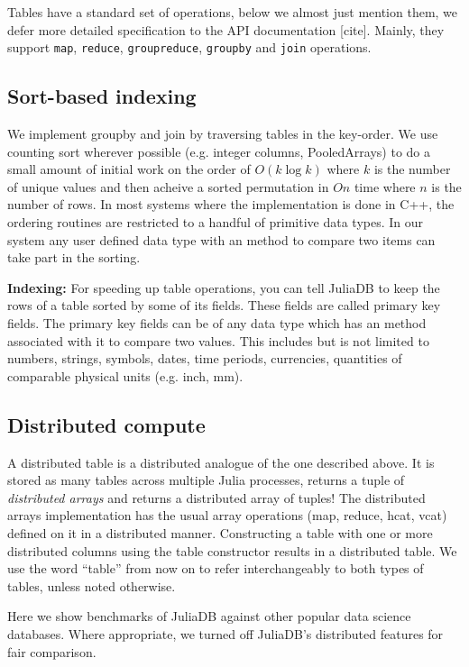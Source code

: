 \documentclass{juliacon}
\begin{document}
Tables have a standard set of operations, below we almost just mention
them, we defer more detailed specification to the API documentation
{[}cite{]}. Mainly, they support \texttt{map}, \texttt{reduce}, \texttt{groupreduce}, \texttt{groupby} and \texttt{join} operations.

\subsection{Sort-based indexing}

We implement groupby and join by traversing tables in the key-order. We use counting sort wherever possible (e.g. integer columns, PooledArrays) to do a small amount of initial work on the order of $O(k \log k)$ where $k$ is the number of unique values and then acheive a sorted permutation in $O n$ time where $n$ is the number of rows. In most systems where the implementation is done in C++, the ordering routines are restricted to a handful of primitive data types. In our system any user defined data type with an  method to compare two items can take part in the sorting.

\textbf{Indexing: }For speeding up table operations, you can tell
JuliaDB to keep the rows of a table sorted by some of its fields.
These fields are called primary key fields. The primary key fields
can be of any data type which has an  method associated
with it to compare two values. This includes but is not limited to
numbers, strings, symbols, dates, time periods, currencies, quantities
of comparable physical units (e.g. inch, mm).

\subsection{Distributed compute}

A distributed table is a distributed analogue of the one described
above. It is stored as many tables across multiple Julia processes,
 returns a tuple of \emph{distributed arrays} and
 returns a distributed array of tuples! The distributed
arrays implementation has the usual array operations (map, reduce,
hcat, vcat) defined on it in a distributed manner. Constructing a
table with one or more distributed columns using the table constructor
results in a distributed table. We use the word ``table'' from now on to refer interchangeably to both types of tables, unless
noted otherwise.

Here we show benchmarks of JuliaDB against other popular data science
databases. Where appropriate, we turned off JuliaDB's distributed
features for fair comparison.
\end{document}
